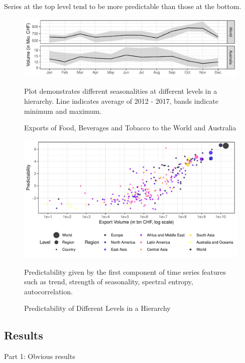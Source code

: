 \documentclass[a4paper,fleqn,11pt]{article}
\begin{document}
Series at the top level tend to be more predictable than those at the bottom.

\begin{figure}[H]
	\includegraphics[width=\textwidth]{fig/fig_season}
	\caption{Exports of Food, Beverages and Tobacco to the World and Australia}
	\footnotesize{Plot demonstrates different seasonalities at different levels in a hierarchy. Line indicates average of 2012 - 2017, bands indicate minimum and maximum.}
\end{figure}

\begin{figure}[H]
	\includegraphics[width=\textwidth]{fig/fig_confetti}
	\caption{Predictability of Different Levels in a Hierarchy}
	\footnotesize{Predictability given by the first component of time series features such as trend, strength of seasonality, spectral entropy, autocorrelation.}
\end{figure}


\subsection{Results}
 Part 1: Obvious results 
 
\end{document}
